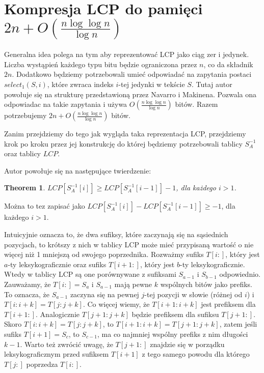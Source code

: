 \documentclass{article}
\newtheorem{theorem}{Theorem}
\begin{document}
\section{Kompresja LCP do pamięci $2n + O(\frac{n \log\log{n}}{\log{n}})$}

Generalna idea polega na tym aby reprezentować LCP jako ciąg zer i jedynek. Liczba wystąpień każdego typu bitu będzie ograniczona przez $n$, co da składnik $2n$. Dodatkowo będziemy potrzebowali umieć odpowiadać na zapytania postaci $select_1(S, i)$, które zwraca indeks $i$-tej jedynki w tekście $S$. Tutaj autor powołuje się na strukturę przedstawioną przez Navarro i M\:akinena. Pozwala ona odpowiadac na takie zapytania i używa $O(\frac{n \log\log{n}}{\log{n}})$ bitów. Razem potrzebujemy $2n +  O(\frac{n \log\log{n}}{\log{n}})$ bitów.

Zanim przejdziemy do tego jak wygląda taka reprezentacja LCP, przejdziemy krok po kroku przez jej konstrukcję do której będziemy potrzebowali tablicy $S_A^{-1}$ oraz tablicy $LCP$. 

Autor powołuje się na następujące twierdzenie:

\begin{theorem}
$LCP[S_A^{-1}[i]] \ge LCP[S_A^{-1}[i - 1]] - 1$, dla każdego $ i > 1$.
\end{theorem}

Można to tez zapisać jako $LCP[S_A^{-1}[i]] - LCP[S_A^{-1}[i - 1]] \ge - 1$, dla każdego $ i > 1$.

Intuicyjnie oznacza to, że dwa sufiksy, które zaczynają się na sąsiednich pozycjach, to krótszy z nich w tablicy LCP może mieć przypisaną wartość o nie więcej niż 1 mniejszą od swojego poprzednika. Rozważmy sufiks $T[i:]$, który jest $a$-ty leksykograficznie oraz sufiks $T[i+1:]$, który jest $b$-ty leksykograficznie. Wtedy w tablicy LCP są one porównywane z sufiksami $S_{a-1}$ i $S_{b-1}$ odpowiednio. Zauważamy, że $T[i:] = S_a$ i $S_{a-1}$ mają pewne $k$ wspólnych bitów jako prefiks. To oznacza, że $S_{a-1}$ zaczyna się na pewnej $j$-tej pozycji w słowie (różnej od $i$) i $T[i:i+k] = T[j:j+k]$. Co więcej wiemy, że $T[i+1:i+k]$ jest prefiksem dla $T[i+1:]$. Analogicznie $T[j+1:j+k]$ będzie prefiksem dla sufiksu $T[j+1:]$. Skoro $T[i:i+k] = T[j:j+k]$, to $T[i+1:i+k] = T[j+1: j+k]$, zatem jeśli sufiks $T[i+1] = S_c$, to $S_{c-1}$, ma co najmniej wspólny prefiks z nim długości $k-1$. Warto też zwrócić uwagę, że $T[j+1:]$ znajdzie się w porządku leksykograficznym przed sufiksem $T[i+1]$ z tego samego powodu dla którego $T[j:]$ poprzedza $T[i:]$.
\end{document}
